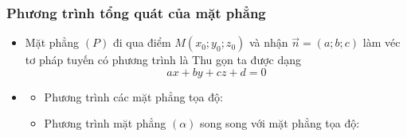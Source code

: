 \subsubsection{Phương trình tổng quát của mặt phẳng}
\begin{itemize}
	\item [\iconMT]  Mặt phẳng $(P)$ đi qua điểm $M(x_0;y_0;z_0)$ và nhận $\vec{n}=(a;b;c)$ làm véc tơ pháp tuyến có phương trình là 
	Thu gọn ta được dạng 
	$$ax+by+cz+d=0$$
	\item [\iconMT] 
	\begin{boxdn}
		\begin{itemize}
			\item [\ding{172}] Phương trình các mặt phẳng tọa độ: 
			\item [\ding{173}] Phương trình mặt phẳng $(\alpha)$ song song với mặt phẳng tọa độ: 
		\end{itemize}
	\end{boxdn}
\end{itemize}

